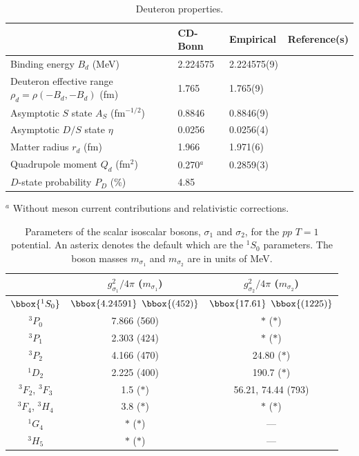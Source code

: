 \pagebreak



\begin{table}
\caption{Deuteron properties.}
\begin{tabular}{lllc}
           & CD-Bonn & Empirical & Reference(s) \\
\hline
Binding energy $B_d$ (MeV) 
& 2.224575 & 2.224575(9) & \cite{LA82} \\
Deuteron effective range $\rho_d=\rho(-B_d,-B_d)$ (fm)
& 1.765&  1.765(9) 
& \cite{KMS84,STS95,ER83}\\
Asymptotic $S$ state $A_S$ (fm$^{-1/2}$)
&0.8846& 0.8846(9) 
& \cite{STS95,ER83}\\
Asymptotic $D/S$ state $\eta$        
& 0.0256& 0.0256(4) & \cite{RK90}\\
Matter radius $r_d$ (fm)    
& 1.966 & 1.971(6) & \cite{MSZ95}\\
Quadrupole moment $Q_d$ (fm$^2$)
& 0.270$^a$ & 0.2859(3) & \cite{BC79,ER83}\\
$D$-state probability $P_D$ (\%)    & 4.85  \\
\end{tabular}
$^a$ Without meson current contributions and relativistic corrections.
\label{tab_deu}
\end{table}


\pagebreak


\begin{table}
\caption{Parameters of the scalar isoscalar bosons, $\sigma_1$
and $\sigma_2$, for the $pp$ $T=1$ potential. An asterix denotes
the default which are the $^1S_0$ parameters.
The boson masses $m_{\sigma_1}$ and $m_{\sigma_2}$ are in units of MeV.}
\begin{tabular}{ccc}
              
 & $g^2_{\sigma_1}/4\pi$
  ($m_{\sigma_1}$)
 & $g^2_{\sigma_2}/4\pi$
  ($m_{\sigma_2}$)
\\
\hline 
$\bbox{^1S_0}$ & $\bbox{4.24591}$ $\bbox{(452)}$ & $\bbox{17.61}$ $\bbox{(1225)}$  \\
$^3P_0$ & 7.866 (560) & $\ast$ ($\ast$) \\
$^3P_1$ & 2.303 (424) & $\ast$ ($\ast$) \\
$^3P_2$ & 4.166 (470) & 24.80 ($\ast$) \\
$^1D_2$ & 2.225 (400) & 190.7 ($\ast$) \\
$^3F_2$, $^3F_3$ & 1.5 ($\ast$) & 56.21, 74.44 (793) \\
$^3F_4$, $^3H_4$ & 3.8 ($\ast$) & $\ast$ ($\ast$) \\
$^1G_4$ & $\ast$ ($\ast$) & --- \\
$^3H_5$ & $\ast$ ($\ast$) & --- \\
\end{tabular}
\label{tab_par1}
\end{table}


